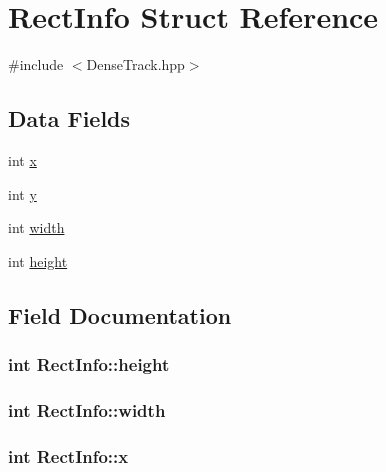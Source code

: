 \hypertarget{structRectInfo}{}\section{Rect\+Info Struct Reference}
\label{structRectInfo}


{\ttfamily \#include $<$Dense\+Track.\+hpp$>$}

\subsection*{Data Fields}
\begin{DoxyCompactItemize}
\item 
int \hyperlink{structRectInfo_a31473a0a6a6c0dabe7fbfe210e8753b7}{x}
\item 
int \hyperlink{structRectInfo_a33dcc1cf63d0c365fc4f5cd716591d59}{y}
\item 
int \hyperlink{structRectInfo_ac903198cf7977f5620c15ffa5d8c40f3}{width}
\item 
int \hyperlink{structRectInfo_a6708935085fd82c5cea0870bb69b9249}{height}
\end{DoxyCompactItemize}


\subsection{Field Documentation}
\hypertarget{structRectInfo_a6708935085fd82c5cea0870bb69b9249}{}
\subsubsection[{height}]{\setlength{\rightskip}{0pt plus 5cm}int Rect\+Info\+::height}\label{structRectInfo_a6708935085fd82c5cea0870bb69b9249}
\hypertarget{structRectInfo_ac903198cf7977f5620c15ffa5d8c40f3}{}
\subsubsection[{width}]{\setlength{\rightskip}{0pt plus 5cm}int Rect\+Info\+::width}\label{structRectInfo_ac903198cf7977f5620c15ffa5d8c40f3}
\hypertarget{structRectInfo_a31473a0a6a6c0dabe7fbfe210e8753b7}{}
\subsubsection[{x}]{\setlength{\rightskip}{0pt plus 5cm}int Rect\+Info\+::x}\label{structRectInfo_a31473a0a6a6c0dabe7fbfe210e8753b7}
\hypertarget{structRectInfo_a33dcc1cf63d0c365fc4f5cd716591d59}{}
